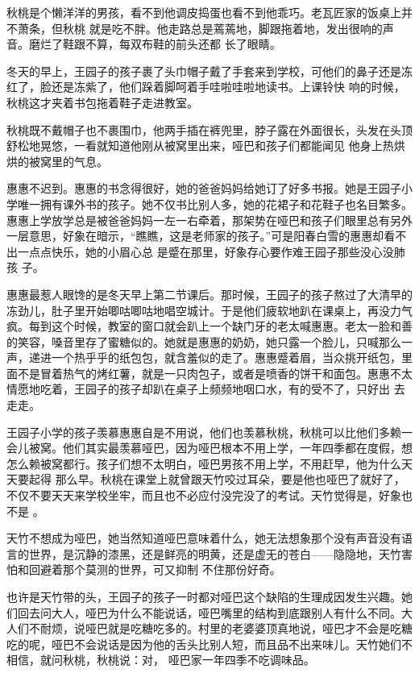 \documentclass{article}
\begin{document}
秋桃是个懒洋洋的男孩，看不到他调皮捣蛋也看不到他乖巧。老瓦匠家的饭桌上并不萧条，但秋桃
\newpage
就是吃不胖。他走路总是蔫蔫地，脚跟拖着地，发出很响的声音。磨烂了鞋跟不算，每双布鞋的前头还都
长了眼睛。 

冬天的早上，王园子的孩子裹了头巾帽子戴了手套来到学校，可他们的鼻子还是冻红了，脸还是冻紫了，他们跺着脚呵着手哇啦哇啦地读书。上课铃快
响的时候，秋桃这才夹着书包拖着鞋子走进教室。 

秋桃既不戴帽子也不裹围巾，他两手插在裤兜里，脖子露在外面很长，头发在头顶舒松地晃悠，一看就知道他刚从被窝里出来，哑巴和孩子们都能闻见
他身上热烘烘的被窝里的气息。 

惠惠不迟到。惠惠的书念得很好，她的爸爸妈妈给她订了好多书报。她是王园子小学唯一拥有课外书的孩子。她不仅书比别人多，她的花裙子和花鞋子也名目繁多。惠惠上学放学总是被爸爸妈妈一左一右牵着，那架势在哑巴和孩子们眼里总有另外一层意思，好象在暗示，“瞧瞧，这是老师家的孩子。”可是阳春白雪的惠惠却看不出一点点快乐，她的小眉心总
\newpage
是蹙在那里，好象存心要作难王园子那些没心没肺孩
子。 

惠惠最惹人眼馋的是冬天早上第二节课后。那时候，王园子的孩子熬过了大清早的冻劲儿，肚子里开始唧咕唧咕地唱空城计。于是他们疲软地趴在课桌上，再没力气疯。每到这个时候，教室的窗口就会趴上一个缺门牙的老太喊惠惠。老太一脸和善的笑容，嗓音里存了蜜糖似的。她就是惠惠的奶奶，她只露一个脸儿，只喊那么一声，递进一个热乎乎的纸包包，就含羞似的走了。惠惠蹙着眉，当众挑开纸包，里面不是冒着热气的烤红薯，就是一只肉包子，或者是喷香的饼干和面包。惠惠不太情愿地吃着，王园子的孩子却趴在桌子上频频地咽口水，有的受不了，只好出
去走走。 

王园子小学的孩子羡慕惠惠自是不用说，他们也羡慕秋桃，秋桃可以比他们多赖一会儿被窝。他们其实最羡慕哑巴，因为哑巴根本不用上学，一年四季都在度假，想怎么赖被窝都行。孩子们想不太明白，哑巴男孩不用上学，不用赶早，他为什么天天要起得
\newpage
那么早。秋桃在课堂上就曾跟天竹咬过耳朵，要是他也哑巴了就好了，不仅不要天天来学校坐牢，而且也不必应付没完没了的考试。天竹觉得是，好象也不是
。 

天竹不想成为哑巴，她当然知道哑巴意味着什么，她无法想象那个没有声音没有语言的世界，是沉静的漆黑，还是鲜亮的明黄，还是虚无的苍白——隐隐地，天竹害怕和回避着那个莫测的世界，可又抑制
不住那份好奇。 

也许是天竹带的头，王园子的孩子一时都对哑巴这个缺陷的生理成因发生兴趣。她们回去问大人，哑巴为什么不能说话，哑巴嘴里的结构到底跟别人有什么不同。大人们不耐烦，说哑巴就是吃糖吃多的。村里的老婆婆顶真地说，哑巴才不会是吃糖吃的呢，哑巴不会说话是因为他的舌头比别人短，而且品不出来味儿。天竹她们不相信，就问秋桃，秋桃说：对，
哑巴家一年四季不吃调味品。 
\end{document}

